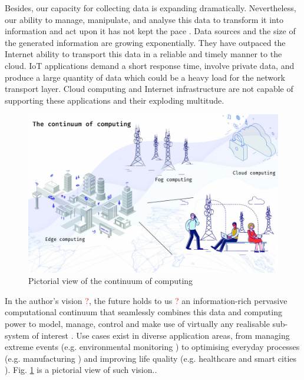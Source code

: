 Besides, our capacity for collecting data is expanding dramatically. Nevertheless, our ability to manage, manipulate, and analyse this data to transform it into information and act upon it has not kept the pace \cite{computing-in-continuum}. Data sources and the size of the generated information are growing exponentially. They have outpaced the Internet ability to transport this data in a reliable and timely manner to the cloud. IoT applications demand a short response time, involve private data, and produce a large quantity of data which could be a heavy load for the network transport layer. Cloud computing and Internet infrastructure are not capable of supporting these applications and their exploding multitude.

\begin{figure}[h]
\centering
\includegraphics[width=\textwidth]{figures/continuum}
\caption{Pictorial view of the continuum of computing \label{fig:continuum}}
\end{figure}

In the author's vision \textcolor{red}{?}, the future holds to us \textcolor{red}{?} an information-rich pervasive computational continuum that seamlessly combines this data and computing power to model, manage, control and make use of virtually any realisable sub-system of interest \cite{computing-in-continuum}. Use cases exist in diverse application areas, from managing extreme events (e.g. environmental monitoring \cite{levee}) to optimising everyday processes (e.g. manufacturing \cite{iot-manifacturing}) and improving life quality (e.g. healthcare \cite{iot-healthcare} and smart cities \cite{data-analytics-iot}). Fig. \ref{fig:continuum} is a pictorial view of such vision..

